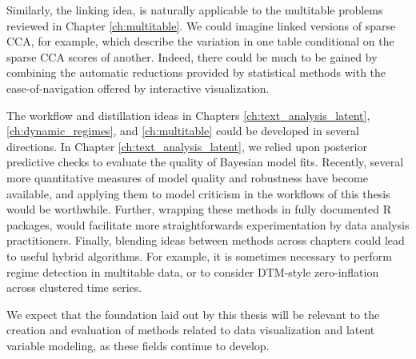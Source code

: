 Similarly, the linking idea, is naturally applicable to the multitable problems
reviewed in Chapter \ref{ch:multitable}. We could imagine linked versions of
sparse CCA, for example, which describe the variation in one table conditional
on the sparse CCA scores of another. Indeed, there could be much to be gained by
combining the automatic reductions provided by statistical methods with the
ease-of-navigation offered by interactive visualization.

The workflow and distillation ideas in Chapters \ref{ch:text_analysis_latent},
\ref{ch:dynamic_regimes}, and \ref{ch:multitable} could be developed in several
directions. In Chapter \ref{ch:text_analysis_latent}, we relied upon posterior
predictive checks to evaluate the quality of Bayesian model fits. Recently,
several more quantitative measures of model quality \citep{gorham2015measuring,
  liu2016kernelized} and robustness \citep{giordano2016fast} have become
available, and applying them to model criticism in the workflows of this thesis
would be worthwhile. Further, wrapping these methods in fully documented R
packages, would facilitate more straightforwards experimentation by data
analysis practitioners. Finally, blending ideas between methods across chapters
could lead to useful hybrid algorithms. For example, it is sometimes necessary
to perform regime detection in multitable data, or to consider DTM-style
zero-inflation across clustered time series.

We expect that the foundation laid out by this thesis will be relevant to the
creation and evaluation of methods related to data visualization and latent
variable modeling, as these fields continue to develop.
